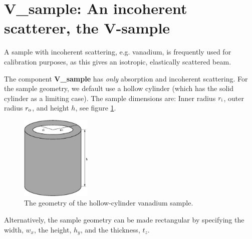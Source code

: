 \section{V\_sample: An incoherent scatterer, the V-sample}
\label{s:v_sample}


A sample with incoherent scattering, e.g. vanadium, is frequently used for
calibration purposes, as this gives an isotropic, elastically scattered beam.

The component {\bf V\_sample}
has {\em only} absorption and incoherent scattering.
For the sample geometry, we default use a
hollow cylinder (which has the solid cylinder as a limiting case).
The sample dimensions are: Inner radius $r_{\rm i}$,
outer radius $r_{\rm o}$, and height $h$, see figure \ref{f:v-sample}.
\begin{figure}
  \begin{center}
    \includegraphics[width=0.3\textwidth]{figures/vsample.eps}
  \end{center}
\caption{The geometry of the hollow-cylinder vanadium sample.}
\label{f:v-sample}
\end{figure}


Alternatively, the sample geometry can be made rectangular 
by specifying the width, $w_x$, the height, $h_y$, and the thickness, $t_z$.

